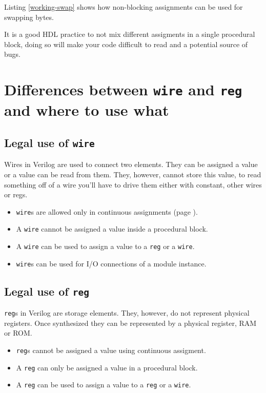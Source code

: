 \documentclass[a4paper,10pt]{article}
\theoremstyle{mytheor}
\newcommand{
  \insertverilog}[3]{
  
}
\newcounter{pitfallCount} %
\newcommand{\pitfallcounter}[1]{%
  \refstepcounter{pitfallCount}%
  \thepitfallCount%
  \label{#1}}%
\newcommand{\pitfall}[2] {
  \begin{tcolorbox}[arc=0pt,colback=yellow!10!white,colframe=orange!75!black,title=\textbf{Common Pitfall - \pitfallcounter{#1}}]
    #2
  \end{tcolorbox}
}
\newcommand{\inlinev}[1]{\lstinline[style=verilog-inline-style]{#1}}
\begin{document}
Listing \ref{working-swap} shows how non-blocking assignments can be
used for swapping bytes.

\insertverilog{./verilog_files/workingSwap.v}{working-swap}{Swapping
  bytes using non-blocking assignment\, it works!}

\pitfall{pitfall:mixing-assignments}{It is a good HDL practice to not mix different assigments in
  a single procedural block, doing so will make your code difficult to
  read and a potential source of bugs.}

\section{Differences between \inlinev{wire} and \inlinev{reg} and where to use what}
\subsection{Legal use of \inlinev{wire}}
Wires in Verilog are used to connect two elements. They can be
assigned a value or a value can be read from them. They, however,
cannot store this value, to read something off of a wire you'll have
to drive them either with constant, other wires or regs.

\begin{itemize}
\item \inlinev{wire}s are allowed only
  in continuous assignments (page \pageref{continuous-assignment}).
\item A \inlinev{wire} cannot be
  assigned a value inside a procedural block.
\item A \inlinev{wire} can be used to
  assign a value to a \inlinev{reg} or a
  \inlinev{wire}.
\item \inlinev{wire}s can be used for I/O connections of a module instance.
\end{itemize}

\subsection{Legal use of \inlinev{reg}}
\inlinev{reg}s in Verilog are storage
elements. They, however, do not represent physical registers. Once
synthesized they can be represented by a physical register, RAM or
ROM.

 \begin{itemize}
 \item \inlinev{reg}s cannot be assigned
   a value using continuous assigment.
 \item A \inlinev{reg} can only be
   assigned a value in a procedural block.
 \item A \inlinev{reg} can be used to
   assign a value to a \inlinev{reg} or
   a \inlinev{wire}.
\end{itemize}
\end{document}
